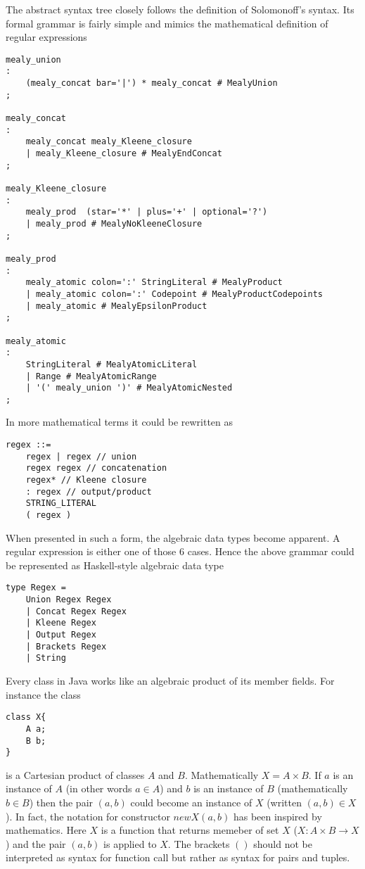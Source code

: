 The abstract syntax tree closely follows the definition of Solomonoff's syntax. Its formal grammar is fairly simple and mimics the mathematical definition of regular expressions
\begin{lstlisting}
mealy_union
:
    (mealy_concat bar='|') * mealy_concat # MealyUnion
;

mealy_concat
:
    mealy_concat mealy_Kleene_closure
    | mealy_Kleene_closure # MealyEndConcat
;

mealy_Kleene_closure
:
    mealy_prod  (star='*' | plus='+' | optional='?') 
    | mealy_prod # MealyNoKleeneClosure
;

mealy_prod
:
    mealy_atomic colon=':' StringLiteral # MealyProduct
    | mealy_atomic colon=':' Codepoint # MealyProductCodepoints
    | mealy_atomic # MealyEpsilonProduct
;

mealy_atomic
:
    StringLiteral # MealyAtomicLiteral
    | Range # MealyAtomicRange
    | '(' mealy_union ')' # MealyAtomicNested
;
\end{lstlisting}
In more mathematical terms it could be rewritten as
\begin{lstlisting}
regex ::= 
    regex | regex // union
    regex regex // concatenation
    regex* // Kleene closure
    : regex // output/product
    STRING_LITERAL 
    ( regex ) 
\end{lstlisting}
When presented in such a form, the algebraic data types become apparent.
A regular expression is either one of those 6 cases. Hence the above grammar could be represented as Haskell-style algebraic data type
\begin{lstlisting}
type Regex = 
    Union Regex Regex 
    | Concat Regex Regex
    | Kleene Regex
    | Output Regex
    | Brackets Regex
    | String
\end{lstlisting}
Every class in Java works like an algebraic product of its member fields. For instance the class 
\begin{lstlisting}
class X{
    A a;
    B b;
}
\end{lstlisting}
is a Cartesian product of classes $A$ and $B$. Mathematically $X=A\times B$. If $a$ is an instance of $A$ (in other words $a\in A$) and $b$ is an instance of $B$ (mathematically $b\in B$) then the pair $(a,b)$ could become an instance of $X$ (written $(a,b)\in X$). In fact, the notation for constructor $new X(a,b)$ has been inspired by mathematics. Here  $X$ is a function that returns memeber of set $X$ ($X:A \times B \rightarrow X$) and the pair $(a,b)$ is applied to $X$. The brackets $()$ should not be interpreted as syntax for function call but rather as syntax for pairs and tuples. 

